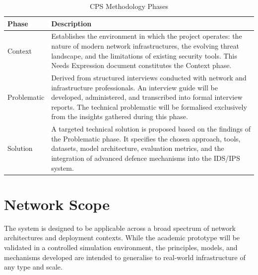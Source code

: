 \documentclass[12pt,a4paper]{report}
\begin{document}
\begin{table}[h!]
\centering
\caption{CPS Methodology Phases}
\begin{tabular}{@{}B{2.5cm} L{11.5cm}@{}}
  \toprule
  \textbf{Phase} & \textbf{Description} \\
  \midrule
  Context     & Establishes the environment in which the project operates: the nature of
                modern network infrastructures, the evolving threat landscape, and the
                limitations of existing security tools. This Needs Expression document
                constitutes the Context phase. \\
  \addlinespace
  Problematic & Derived from structured interviews conducted with network and infrastructure
                professionals. An interview guide will be developed, administered, and
                transcribed into formal interview reports. The technical problematic will be
                formalised exclusively from the insights gathered during this phase. \\
  \addlinespace
  Solution    & A targeted technical solution is proposed based on the findings of the
                Problematic phase. It specifies the chosen approach, tools, datasets, model
                architecture, evaluation metrics, and the integration of advanced defence
                mechanisms into the IDS/IPS system. \\
  \bottomrule
\end{tabular}
\label{tab:cps}
\end{table}

\chapter{Network Scope}

The system is designed to be applicable across a broad spectrum of network architectures and
deployment contexts. While the academic prototype will be validated in a controlled simulation
environment, the principles, models, and mechanisms developed are intended to generalise to
real-world infrastructure of any type and scale.
\end{document}

